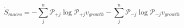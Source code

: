 \begin{equation}
\dot S_{macro} = -\sum_j^n\mathcal P_{+j}\log\mathcal P_{+j}v_{growth} -\sum_j^n\mathcal P_{-j}\log\mathcal P_{-j} v_{growth}
\end{equation}